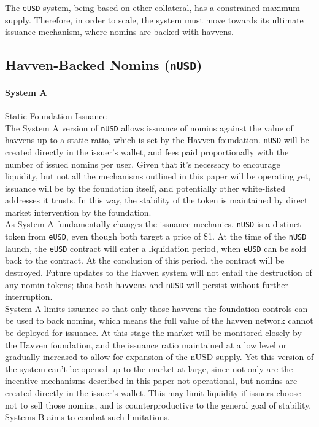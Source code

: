 \noindent The \texttt{eUSD} system, being based on ether collateral, has a constrained
maximum supply. Therefore, in order to scale, the system must move towards its ultimate
issuance mechanism, where nomins are backed with havvens.

\pagebreak
\subsection{Havven-Backed Nomins (\texttt{nUSD})}

\paragraph{System A} Static Foundation Issuance \\

\noindent The System A version of \texttt{nUSD} allows issuance of nomins against
the value of havvens up to a static ratio, which is set by the Havven foundation.
\texttt{nUSD} will be created directly in the issuer's wallet, and fees paid
proportionally with the number of issued nomins per user. Given that it's necessary to
encourage liquidity, but not all the mechanisms outlined in this paper will be operating
yet, issuance will be by the foundation itself, and potentially other white-listed
addresses it trusts. In this way, the stability of the token is maintained by direct
market intervention by the foundation. \\

\noindent As System A fundamentally changes the issuance mechanics, \texttt{nUSD} is a distinct
token from \texttt{eUSD}, even though both target a price of \$1. At the time of the \texttt{nUSD}
launch, the \texttt{eUSD} contract will enter a liquidation period, when \texttt{eUSD}
can be sold back to the contract. At the conclusion of this period, the contract will be destroyed.
Future updates to the Havven system will not entail the destruction of any nomin tokens;
thus both \texttt{havvens} and \texttt{nUSD} will persist without further interruption. \\

\noindent System A limits issuance so that only those havvens the foundation controls can be
used to back nomins, which means the full value of the havven network cannot be deployed for
issuance. At this stage the market will be monitored closely by the Havven foundation, 
and the issuance ratio maintained at a low level or gradually increased to allow for
expansion of the nUSD supply.
Yet this version of the system can't be opened up to the market at large, since not only are
the incentive mechanisms described in this paper not operational, but nomins are created
directly in the issuer's wallet. This may limit liquidity if issuers choose not to sell those
nomins, and is counterproductive to the general goal of stability. Systems B aims to combat
such limitations. \\


